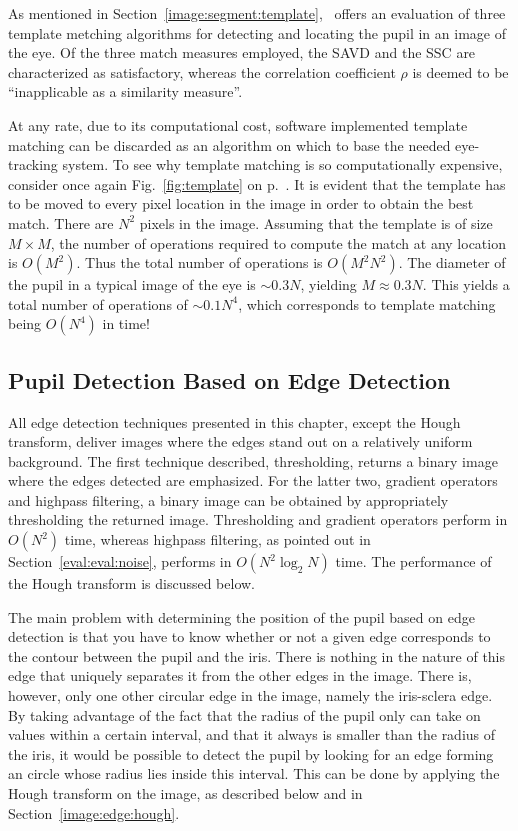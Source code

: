 As mentioned in Section~\ref{image:segment:template},~\cite{template}
offers an evaluation of three template metching algorithms for
detecting and locating the pupil in an image of the eye.  Of the three
match measures employed, the SAVD and the SSC are characterized as
satisfactory, whereas the correlation coefficient $\rho$ is deemed to
be ``inapplicable as a similarity measure''.

At any rate, due to its computational cost, software implemented
template matching can be discarded as an algorithm on which to base
the needed eye-tracking system.  To see why template matching is so
computationally expensive, consider once again Fig.~\ref{fig:template}
on p.~\pageref{fig:template}.  It is evident that the template has to
be moved to every pixel location in the image in order to obtain the
best match.  There are $N^{2}$ pixels in the image.  Assuming that the
template is of size $M\times M$, the number of operations required to
compute the match at any location is $O(M^{2})$.  Thus the total
number of operations is $O(M^{2}N^{2})$.  The diameter of the pupil in
a typical image of the eye is $\sim 0.3N$, yielding $M\approx 0.3N$.
This yields a total number of operations of $\sim 0.1N^{4}$, which
corresponds to template matching being $O(N^{4})$ in time!

\subsection{Pupil Detection Based on Edge Detection}
\label{eval:eval:edge}

All edge detection techniques presented in this chapter, except the
Hough transform, deliver images where the edges stand out on a
relatively uniform background.  The first technique described,
thresholding, returns a binary image where the edges detected are
emphasized.  For the latter two, gradient operators and highpass
filtering, a binary image can be obtained by appropriately
thresholding the returned image.  Thresholding and gradient operators
perform in $O(N^{2})$ time, whereas highpass filtering, as pointed out
in Section~\ref{eval:eval:noise}, performs in $O(N^{2}\log_{2}N)$
time.  The performance of the Hough transform is discussed below.

The main problem with determining the position of the pupil based on
edge detection is that you have to know whether or not a given edge
corresponds to the contour between the pupil and the iris.  There is
nothing in the nature of this edge that uniquely separates it from the
other edges in the image.  There is, however, only one other circular
edge in the image, namely the iris-sclera edge.  By taking advantage
of the fact that the radius of the pupil only can take on values
within a certain interval, and that it always is smaller than the
radius of the iris, it would be possible to detect the pupil by
looking for an edge forming an circle whose radius lies inside this
interval.  This can be done by applying the Hough transform on the
image, as described below and in Section~\ref{image:edge:hough}.

